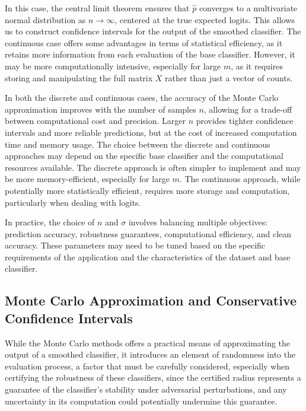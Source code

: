 In this case, the central limit theorem ensures that $\hat{p}$ converges to a multivariate normal distribution as $n \rightarrow \infty$, centered at the true expected logits.
This allows us to construct confidence intervals for the output of the smoothed classifier.
The continuous case offers some advantages in terms of statistical efficiency, as it retains more information from each evaluation of the base classifier.
However, it may be more computationally intensive, especially for large $m$, as it requires storing and manipulating the full matrix $X$ rather than just a vector of counts.

In both the discrete and continuous cases, the accuracy of the Monte Carlo approximation improves with the number of samples $n$, allowing for a trade-off between computational cost and precision.
Larger $n$ provides tighter confidence intervals and more reliable predictions, but at the cost of increased computation time and memory usage.
The choice between the discrete and continuous approaches may depend on the specific base classifier and the computational resources available.
The discrete approach is often simpler to implement and may be more memory-efficient, especially for large $m$.
The continuous approach, while potentially more statistically efficient, requires more storage and computation, particularly when dealing with logits.

In practice, the choice of $n$ and $\sigma$ involves balancing multiple objectives: prediction accuracy, robustness guarantees, computational efficiency, and clean accuracy.
These parameters may need to be tuned based on the specific requirements of the application and the characteristics of the dataset and base classifier.

\subsection{Monte Carlo Approximation and Conservative Confidence Intervals}\label{subsec:monte-carlo-approximation-and-conservative-confidence-intervals}

While the Monte Carlo methods offers a practical means of approximating the output of a smoothed classifier, it introduces an element of randomness into the evaluation process, a factor that must be carefully considered, especially when certifying the robustness of these classifiers, since the certified radius represents a guarantee of the classifier's stability under adversarial perturbations, and any uncertainty in its computation could potentially undermine this guarantee.

